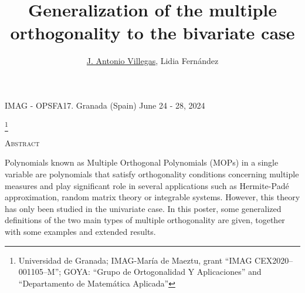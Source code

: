 \documentclass[11pt,a4paper]{amsart}
\newcommand{\head}{
{\noindent \small IMAG - OPSFA17.
Granada (Spain) June 24 - 28, 2024} \vspace{10pt}}
\begin{document}
\head \vspace{1cm}



\title{Generalization of the multiple orthogonality to the bivariate case}

\author{\underline{J. Antonio Villegas}, Lidia Fernández}

\thanks{Universidad de Granada; IMAG-María de Maeztu, grant ``IMAG CEX2020–001105–M''; GOYA: ``Grupo de Ortogonalidad Y Aplicaciones'' and ``Departamento de Matemática Aplicada''}

\maketitle






\begin{center} \textsc{Abstract}
\end{center}



Polynomials known as Multiple Orthogonal Polynomials (MOPs) in a single variable are polynomials that satisfy orthogonality conditions concerning multiple measures and play significant role in several applications such as Hermite-Padé approximation, random matrix theory or integrable systems. However, this theory has only been studied in the univariate case. In this poster, some generalized definitions of the two main types of multiple orthogonality are given, together with some examples and extended results. 
\end{document}
